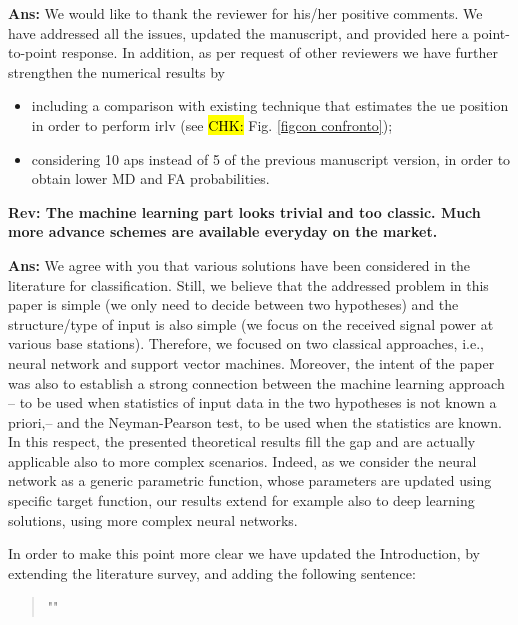 \documentclass[draftcls,onecolumn,12pt]{IEEEtran}
\newcounter{revc}
\newcommand{\revp}[1]{\zref[revcontent]{#1}}
\begin{document}

{\bf Ans:} We would like to thank the reviewer for his/her positive comments. We have addressed all the issues, updated the manuscript, and provided here a point-to-point response. In addition, as per request of other reviewers we have further strengthen the numerical results by 
\begin{itemize}
    \item including a comparison with existing technique that estimates the \ac{ue} position in order to perform \ac{irlv} (see \hl{CHK:} Fig. \ref{figcon confronto});
    \item considering 10 \acp{ap} instead of 5 of the previous manuscript version, in order to obtain lower MD and FA probabilities.
\end{itemize}


\vspace{5mm} %
\begin{framed}
{\bf Rev: The machine learning part looks trivial and too classic. Much more advance schemes are available everyday on the market.}
\end{framed}
 

{\bf Ans:} We agree with you that various solutions have been considered in the literature for classification. Still, we believe that the addressed problem in this paper is simple (we only need to decide between two hypotheses) and the structure/type of input is also simple (we focus on the received signal power at various base stations). Therefore, we focused on two classical approaches, i.e., neural network and support vector machines. Moreover, the intent of the paper was also to establish a strong connection between the machine learning approach -- to be used when statistics of input data in the two hypotheses is not known a priori,-- and the Neyman-Pearson test, to be used when the statistics are known. In this respect, the presented theoretical results fill the gap and are actually applicable also to more complex scenarios. Indeed, as we consider the neural network as a generic parametric function, whose parameters are updated using specific target function, our results extend for example also to deep learning solutions, using more complex neural networks.

In order to make this point more clear we have updated the Introduction, by extending the literature survey, and adding the following sentence:
\begin{quote}
    "\revp{rev11a}"
\end{quote}
\end{document}

